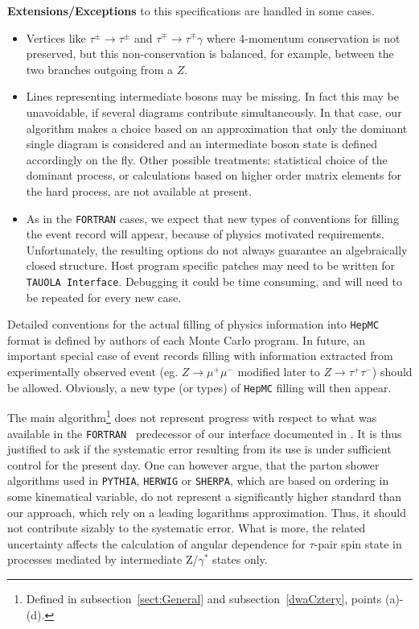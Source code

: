 \documentclass[]{Tauola_interface_design}
\begin{document}
\noindent
\textbf{ Extensions/Exceptions} to this specifications  are handled in some cases. 

  \begin{itemize} 
    \item  Vertices like $\tau^\pm \rightarrow \tau^\pm$ and $\tau^\mp \rightarrow \tau^\mp \gamma$ 
           where 4-momentum conservation is not preserved, but this
           non-conservation is balanced, for example, between the two branches
outgoing from a $Z$. 
    \item  Lines representing
           intermediate bosons may be missing. In fact this may be unavoidable, if several 
           diagrams contribute simultaneously. In that case, our algorithm makes a choice
           based on an approximation that
           only the dominant  single diagram is considered
           and an intermediate boson state is defined accordingly on the fly. Other possible treatments:
           statistical choice of the dominant process, or calculations based on higher order
           matrix elements for the hard process, are not available at present.
    \item
           As in the {\tt FORTRAN} cases, we expect that  new  types of 
           conventions for filling the event record
           will appear, because of physics motivated requirements.
           Unfortunately, the resulting options do not always guarantee
           an algebraically closed structure.  
           Host program specific patches  may need to be written for  
           {\tt TAUOLA Interface}. 
           Debugging it could be time consuming, and will need to be repeated for every new
           case.
   \end{itemize}


Detailed
conventions for the actual filling of physics information into {\tt HepMC} format
is defined by authors of each Monte Carlo program.
 In future,  an important special case of event records filling with
information extracted from experimentally observed event (eg. $Z\to \mu^+\mu^-$
 modified later to $Z\to \tau^+\tau^-$) should be allowed.
  Obviously, a new type (or types) of {\tt HepMC} filling will then appear.

The main algorithm\footnote{ Defined in subsection~\ref{sect:General} and subsection~\ref{dwaCztery}, points (a)-(d).}
 does not represent progress with respect to what was
available in the
{\tt FORTRAN } predecessor of our 
interface documented in \cite{Golonka:2003xt}. 
It is thus justified to ask if the systematic 
error resulting from its use
is under sufficient control for the present day. 
One can however argue, that
the parton shower algorithms used in {\tt PYTHIA}, {\tt HERWIG} or {\tt SHERPA},
which are
based on ordering in some kinematical variable, do not represent
a significantly higher standard than  our approach, which  
 rely on a leading logarithms approximation. Thus, it should not contribute 
sizably to the systematic error. What is more, the related uncertainty 
affects the calculation of
angular dependence for 
$\tau$-pair spin state in processes mediated by intermediate Z/$\gamma^*$
states only. 
\end{document}
